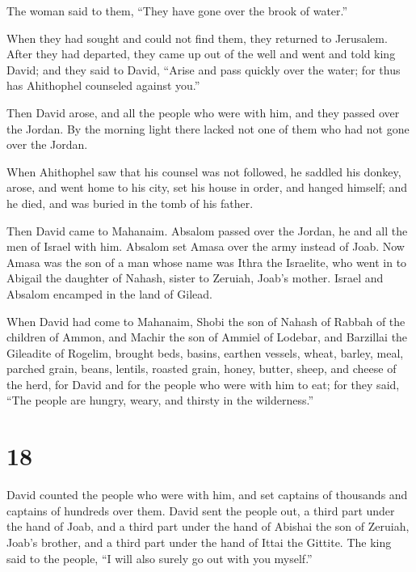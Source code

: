 The woman said to them, ``They have gone over the brook of water.''

When they had sought and could not find them, they returned to
Jerusalem.  After they had departed, they came up out of
the well and went and told king David; and they said to David, ``Arise
and pass quickly over the water; for thus has Ahithophel counseled
against you.''

 Then David arose, and all the people who were with him,
and they passed over the Jordan. By the morning light there lacked not
one of them who had not gone over the Jordan.

 When Ahithophel saw that his counsel was not followed, he
saddled his donkey, arose, and went home to his city, set his house in
order, and hanged himself; and he died, and was buried in the tomb of
his father.

 Then David came to Mahanaim. Absalom passed over the
Jordan, he and all the men of Israel with him.  Absalom set
Amasa over the army instead of Joab. Now Amasa was the son of a man
whose name was Ithra the Israelite, who went in to Abigail the daughter
of Nahash, sister to Zeruiah, Joab's mother.  Israel and
Absalom encamped in the land of Gilead.

 When David had come to Mahanaim, Shobi the son of Nahash
of Rabbah of the children of Ammon, and Machir the son of Ammiel of
Lodebar, and Barzillai the Gileadite of Rogelim,  brought
beds, basins, earthen vessels, wheat, barley, meal, parched grain,
beans, lentils, roasted grain,  honey, butter, sheep, and
cheese of the herd, for David and for the people who were with him to
eat; for they said, ``The people are hungry, weary, and thirsty in the
wilderness.''

\hypertarget{section-17}{%
\section{18}\label{section-17}}

 David counted the people who were with him, and set
captains of thousands and captains of hundreds over them. 
David sent the people out, a third part under the hand of Joab, and a
third part under the hand of Abishai the son of Zeruiah, Joab's brother,
and a third part under the hand of Ittai the Gittite. The king said to
the people, ``I will also surely go out with you myself.''

